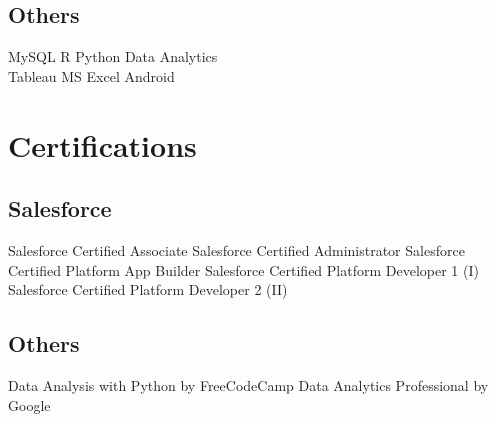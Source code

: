 \documentclass[]{resume-openfont}
\begin{document}
\begin{minipage}[t]{0.33\textwidth}
\subsection{Others}
MySQL \textbullet{} R \textbullet{} Python \textbullet{} Data Analytics \\

Tableau \textbullet{} MS Excel \textbullet{} Android \textbullet{} 
\sectionsep


\section{Certifications}
\subsection{Salesforce}

\textbullet{} Salesforce Certified Associate \newline  \textbullet{}  Salesforce Certified Administrator \newline  \textbullet{}  Salesforce Certified Platform App Builder \newline \textbullet{} Salesforce Certified Platform Developer 1 (I) \newline
 \textbullet{} Salesforce Certified Platform Developer 2 (II) 
\newline \newline
\subsection{Others}
\textbullet{} Data Analysis with Python by FreeCodeCamp \newline
\textbullet{} Data Analytics Professional by Google 


%
%

\end{minipage} 
\hfill
\end{document}
